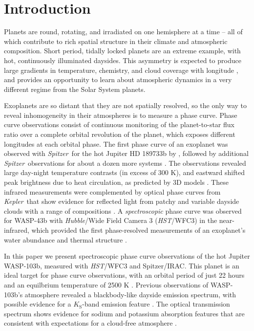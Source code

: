 \documentclass[twocolumn]{aastex61}
\newcommand{\project}[1]{\textsl{#1}}
\newcommand{\HST}{\project{HST}}
\newcommand{\Spitzer}{\project{Spitzer}}
\newcommand{\Kepler}{\project{Kepler}}
\begin{document}
\section{Introduction} \label{sec:intro}
Planets are round, rotating, and irradiated on one hemisphere at a time -- all of which contribute to rich spatial structure in their climate and atmospheric composition.  Short period, tidally locked planets are an extreme example, with hot, continuously illuminated daysides. This asymmetry is expected to produce large gradients in temperature, chemistry, and cloud coverage with longitude \citep{showman09, kataria16, parmentier16}, and provides an opportunity to learn about atmospheric dynamics in a very different regime from the Solar System planets.

Exoplanets are so distant that they are not spatially resolved, so the only way to reveal inhomogeneity in their atmospheres is to measure a phase curve. Phase curve observations consist of continuous monitoring of the planet-to-star flux ratio over a complete orbital revolution of the planet, which exposes different longitudes at each orbital phase.  The first phase curve of an exoplanet was observed with \Spitzer\ for the hot Jupiter HD 189733b by \cite{knutson07}, followed by additional \Spitzer\ observations for about a dozen more systems \citep[cataloged in][]{parmentier17}.  The observations revealed large day-night temperature contrasts (in excess of 300 K), and eastward shifted peak brightness due to heat circulation, as predicted by 3D models \citep{showman02}.  These infrared measurements were complemented by optical phase curves from \Kepler\ that show evidence for reflected light from patchy and variable dayside clouds with a range of compositions \citep{borucki09, demory13, hu15, armstrong16, parmentier16}. A \emph{spectroscopic} phase curve was observed for WASP-43b with \emph{Hubble}/Wide Field Camera 3 (\HST/WFC3) in the near-infrared, which provided the first phase-resolved measurements of an exoplanet's water abundance and thermal structure \citep{stevenson14, stevenson17}.

In this paper we present spectroscopic phase curve observations of the hot Jupiter WASP-103b, measured with \HST/WFC3 and Spitzer/IRAC. This planet is an ideal target for phase curve observations, with an orbital period of just 22 hours and an equilbrium temperature of 2500 K \citep{gillon14}.  Previous observations of WASP-103b's atmosphere revealed a blackbody-like dayside emission spectrum, with possible evidence for a $K_\mathrm{S}$-band emission feature \citep{cartier17, delrez18}. The optical transmission spectrum shows evidence for sodium and potassium absorption features that are consistent with expectations for a cloud-free atmosphere \citep{lendl17}.%
\end{document}
